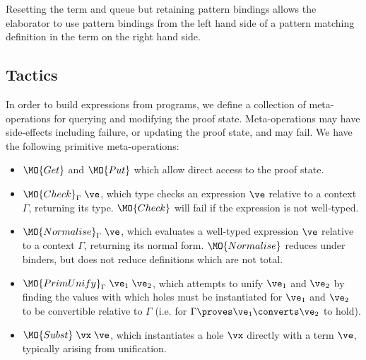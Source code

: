 \DM{
(\vC, \Delta, \hole{\vx}{\vt}\SC\vx, \langle\rangle, \langle\vx\rangle)
}

Resetting the term and queue but retaining pattern bindings
allows the elaborator to use pattern bindings from the left
hand side of a pattern matching definition in the term on the right hand side.


\newcommand{\Check}{\MO{Check}_\Gamma}
\newcommand{\Eval}{\MO{Normalise}_\Gamma}
\newcommand{\Unify}{\MO{Unify}_\Gamma}
\newcommand{\PrimUnify}{\MO{PrimUnify}_\Gamma}
\newcommand{\Subst}{\MO{Subst}}

\subsection{Tactics}

In order to build \TT{} expressions from \Idris{} programs, we define a collection
of meta-operations for querying and modifying the proof state. Meta-operations
may have side-effects including failure, or updating the proof state, and
may fail. We have the following primitive meta-operations:

\begin{itemize}
\item $\MO{Get}$ and $\MO{Put}$ which allow direct access to the proof state.
\item $\Check\;\ve$, which type checks an expression $\ve$ relative to a context
$\Gamma$, returning its type.
$\MO{Check}$ will fail
if the expression is not well-typed.
\item $\Eval\;\ve$, which evaluates a well-typed expression $\ve$ relative to a context 
$\Gamma$, returning its normal form. $\MO{Normalise}$ reduces under binders,
but does not reduce definitions which are not total.
\item 
$\PrimUnify\;\ve_1\;\ve_2$, 
which attempts to unify $\ve_1$ and $\ve_2$ by finding the values with which
holes must be instantiated for $\ve_1$ and $\ve_2$ to be convertible relative
to $\Gamma$ (i.e. for $\Gamma\proves\ve_1\converts\ve_2$ to hold).
\item $\Subst\;\vx\;\ve$, which instantiates a hole $\vx$ directly with a term
$\ve$, typically arising from unification.
\end{itemize}

